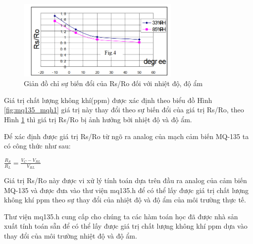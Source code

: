 \begin{figure}[H]
	\centering    
	\includegraphics[width=0.7\textwidth]{mq135_mqh2}
	\caption[Giản đồ chỉ sự biến đổi của Rs/Ro đối với nhiệt độ, độ ẩm]{Giản đồ chỉ sự biến đổi của Rs/Ro đối với nhiệt độ, độ ẩm}
	\label{fig:mq135_mqh2}
\end{figure}


Giá trị chất lượng không khí(ppm) được xác định theo biểu đồ Hình \ref{fig:mq135_mqh1} giá trị này thay đổi theo sự biến đổi của giá trị Rs/Ro, theo Hình \ref{fig:mq135_mqh2} thì giá trị Rs/Ro bị ảnh hưởng bởi nhiệt độ và độ ẩm.

Để xác định được giá trị Rs/Ro từ ngõ ra analog của mạch cảm biến MQ-135 ta có công thức như sau:
\begin{center}
$\displaystyle \frac{R_{S}}{R_{L}} = \frac{V_{C}-V_{RL}}{V_{RL}}$
\end{center}

Giá trị Rs/Ro này được vi xử lý tính toán dựa trên đầu ra analog của cảm biến MQ-135 và được đưa vào thư viện mq135.h để có thể lấy được giá trị chất lượng không khí ppm theo sự thay đổi của nhiệt độ và độ ẩm của môi trường thực tế.

Thư viện mq135.h cung cấp cho chúng ta các hàm toán học đã được nhà sản xuất tính toán sẵn để có thể lấy được giá trị chất lượng không khí ppm dựa vào thay đổi của môi trường nhiệt độ và độ ẩm.



